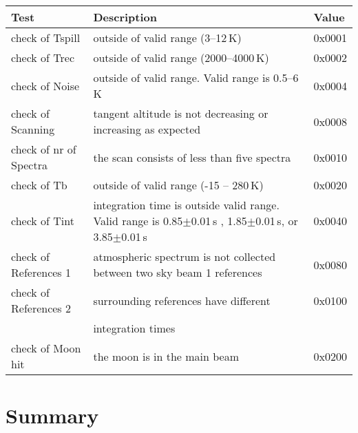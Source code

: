 \begin{table}
\caption{ Description of the \smr\ Quality variable. }
\label{table:quality}
\begin{longtable}{| p{} | p{} | p{} |}
  \hline
  \textbf{Test} & \textbf{Description} & \textbf{Value} \\
  \hline
  check of Tspill   & outside of valid range (3--12\,K) & 0x0001 \\
  \hline
  check of Trec     & outside of valid range (2000--4000\,K) & 0x0002  \\
  \hline
  check of Noise    & outside of valid range. Valid range is 0.5--6\,K & 0x0004  \\
  \hline
  check of Scanning & tangent altitude is not decreasing or increasing as expected & 0x0008 \\
  \hline
  check of nr of Spectra &  the scan consists of less than five spectra & 0x0010\\
  \hline
  check of Tb       & outside of valid range (-15 -- 280\,K) & 0x0020\\ 
  \hline
  check of Tint     & integration time is outside valid range. Valid range is
                      0.85\(\pm\)0.01\,s , 1.85\(\pm\)0.01\,s, or 3.85\(\pm\)0.01\,s & 0x0040\\
  \hline
  check of References 1 & atmospheric spectrum is not collected between two sky beam 1 references     & 0x0080\\
  \hline
  check of References 2 & surrounding references have different & 0x0100\\
                        & integration times                     & \\ 
  \hline check of Moon hit   & the moon is in the main beam          & 0x0200 \\

\hline
\end{longtable}
\end{table}
\addtocounter{table}{-1}



    




\chapter{Summary}


